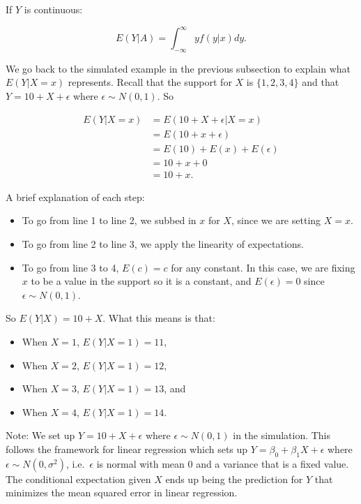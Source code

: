 \documentclass[
]{book}
\providecommand{\tightlist}{%
  \setlength{\itemsep}{0pt}\setlength{\parskip}{0pt}}
\begin{document}
If \(Y\) is continuous:

\begin{equation} 
E(Y|A) = \int_{-\infty}^{\infty} y f(y|x) dy.
\label{eq:5-condexpcont2}
\end{equation}

We go back to the simulated example in the previous subsection to explain what \(E(Y|X=x)\) represents. Recall that the support for \(X\) is \(\{1,2,3,4\}\) and that \(Y = 10 + X + \epsilon\) where \(\epsilon \sim N(0,1)\). So

\[
\begin{split}
E(Y|X=x) &= E(10 + X + \epsilon | X=x)\\
 &= E(10 + x + \epsilon) \\
 &= E(10) + E(x) + E(\epsilon) \\
&= 10 + x + 0 \\
 &= 10 + x.
\end{split}
\]

A brief explanation of each step:

\begin{itemize}
\tightlist
\item
  To go from line 1 to line 2, we subbed in \(x\) for \(X\), since we are setting \(X=x\).
\item
  To go from line 2 to line 3, we apply the linearity of expectations.
\item
  To go from line 3 to 4, \(E(c)=c\) for any constant. In this case, we are fixing \(x\) to be a value in the support so it is a constant, and \(E(\epsilon) = 0\) since \(\epsilon \sim N(0,1)\).
\end{itemize}

So \(E(Y|X) = 10 + X\). What this means is that:

\begin{itemize}
\tightlist
\item
  When \(X=1\), \(E(Y|X=1) = 11\),
\item
  When \(X=2\), \(E(Y|X=1) = 12\),
\item
  When \(X=3\), \(E(Y|X=1) = 13\), and
\item
  When \(X=4\), \(E(Y|X=1) = 14\).
\end{itemize}

Note: We set up \(Y = 10 + X + \epsilon\) where \(\epsilon \sim N(0,1)\) in the simulation. This follows the framework for linear regression which sets up \(Y = \beta_0 + \beta_1 X + \epsilon\) where \(\epsilon \sim N(0,\sigma^2)\), i.e.~\(\epsilon\) is normal with mean 0 and a variance that is a fixed value. The conditional expectation given \(X\) ends up being the prediction for \(Y\) that minimizes the mean squared error in linear regression.
\end{document}
